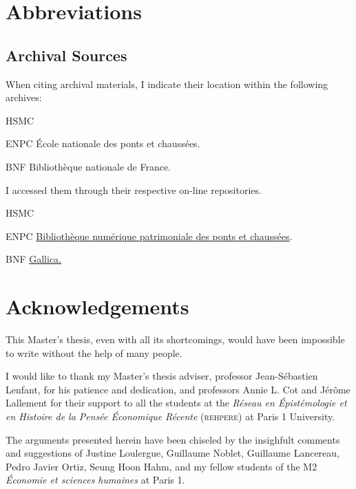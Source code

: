\frontmatter
\pagestyle{plain}
\chapter*{Abbreviations} 
\section*{Archival Sources}

When citing archival materials, I indicate their location within the
following archives:

\begin{labeling}[:]{HSMC} 
\item[ENPC] École nationale des ponts et chaussées.
\item[BNF] Bibliothèque nationale de France. 
\end{labeling}

I accessed them through their respective on-line repositories.

\begin{labeling}[:]{HSMC} 
\item[ENPC] \href{https://patrimoine.enpc.fr/}{Bibliothèque numérique patrimoniale des ponts et chaussées}.
\item[BNF] \href{https://gallica.bnf.fr/}{Gallica.}
\end{labeling}


\chapter{Acknowledgements} 
This Master's thesis, even with all its shortcomings, would have been
impossible to write without the help of many people.

I would like to thank my Master's thesis adviser, professor Jean-Sébastien
Lenfant, for his patience and dedication, and professors Annie L. Cot and
Jérôme Lallement for their support to all the students at the
\textit{Réseau en Épistémologie et en Histoire de la Pensée Économique Récente} (\textsc{rehpere}) at Paris 1 University.

The arguments presented herein have been chiseled by the insighfult
comments and suggestions of Justine Loulergue, Guillaume Noblet, Guillaume
Lancereau, Pedro Javier Ortiz, Seung Hoon Hahm, and my fellow students of
the M2 \textit{Économie et sciences humaines} at Paris 1.

